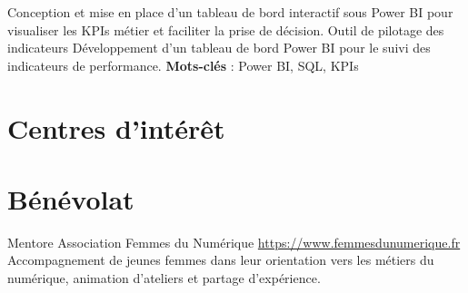 \documentclass[a4paper, serif, 10pt]{moderncv}
\begin{document}
        {Conception et mise en place d'un tableau de bord interactif sous Power BI pour visualiser les KPIs métier et faciliter la prise de décision.
}
        {Outil de pilotage des indicateurs}
        {}
        {}
        {Développement d'un tableau de bord Power BI pour le suivi des indicateurs de performance.
\textbf{Mots-clés} : Power BI, SQL, KPIs}
\section{Centres d'intérêt}

\section{Bénévolat}

        {Mentore}
        {Association Femmes du Numérique}
        {\url{https://www.femmesdunumerique.fr}}
        {}
        {Accompagnement de jeunes femmes dans leur orientation vers les métiers du numérique, animation d'ateliers et partage d'expérience.}
    
\end{document}
